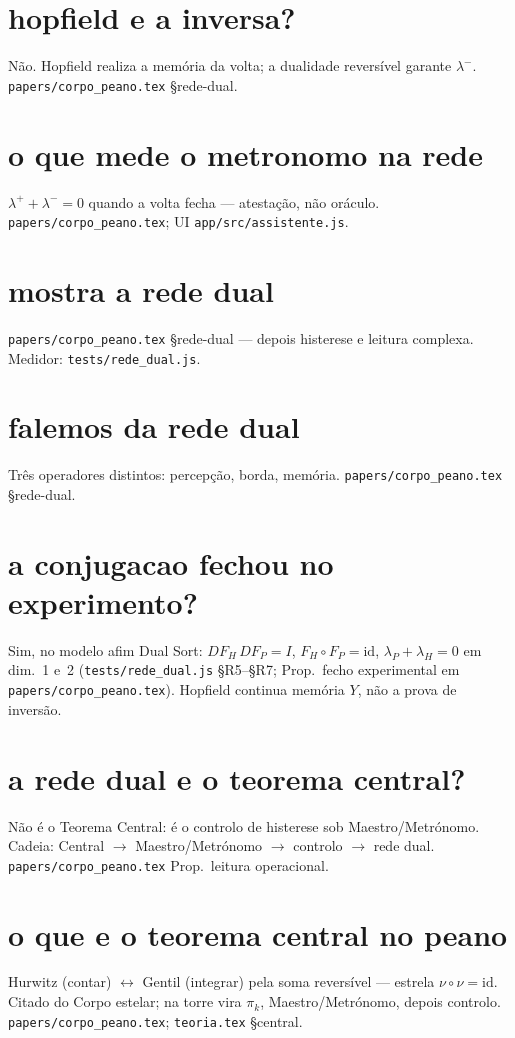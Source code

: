 \documentclass[11pt,a4paper]{article}
\newcommand{\code}[1]{\texttt{\small #1}}
\begin{document}
\section{hopfield e a inversa?}
Não. Hopfield realiza a memória da volta; a dualidade reversível garante $\lambda^{-}$.
\code{papers/corpo\_peano.tex} \S rede-dual.

\section{o que mede o metronomo na rede}
$\lambda^{+}+\lambda^{-}=0$ quando a volta fecha --- atestação, não oráculo.
\code{papers/corpo\_peano.tex}; UI \code{app/src/assistente.js}.

\section{mostra a rede dual}
\code{papers/corpo\_peano.tex} \S rede-dual --- depois histerese e leitura complexa.
Medidor: \code{tests/rede\_dual.js}.

\section{falemos da rede dual}
Três operadores distintos: percepção, borda, memória.
\code{papers/corpo\_peano.tex} \S rede-dual.

\section{a conjugacao fechou no experimento?}
Sim, no modelo afim Dual Sort: $DF_H\,DF_P=I$, $F_H\circ F_P=\mathrm{id}$,
$\lambda_P+\lambda_H=0$ em dim.~1 e~2 (\code{tests/rede\_dual.js} §R5--§R7;
Prop.\ fecho experimental em \code{papers/corpo\_peano.tex}).
Hopfield continua memória $Y$, não a prova de inversão.

\section{a rede dual e o teorema central?}
Não é o Teorema Central: é o controlo de histerese sob Maestro/Metrónomo.
Cadeia: Central $\to$ Maestro/Metrónomo $\to$ controlo $\to$ rede dual.
\code{papers/corpo\_peano.tex} Prop.\ leitura operacional.

\section{o que e o teorema central no peano}
Hurwitz (contar) $\leftrightarrow$ Gentil (integrar) pela soma reversível ---
estrela $\nu\circ\nu=\mathrm{id}$. Citado do Corpo estelar; na torre vira
$\pi_k$, Maestro/Metrónomo, depois controlo.
\code{papers/corpo\_peano.tex}; \code{teoria.tex} \S central.
\end{document}

